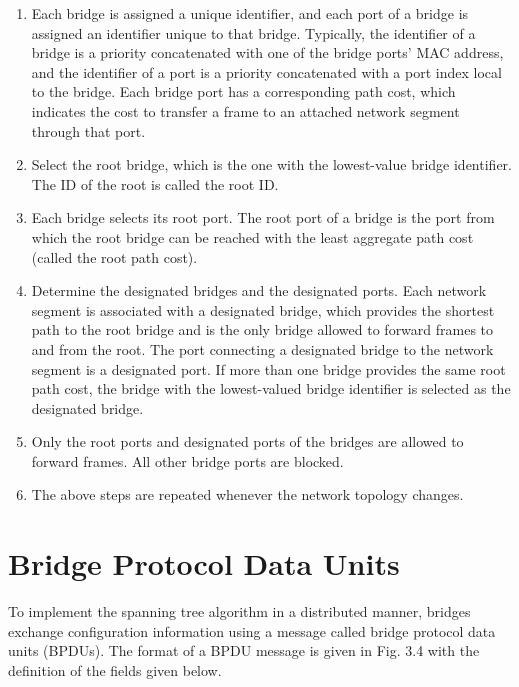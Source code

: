 \documentclass{../UTNetLab}
\begin{document}
\begin{enumerate}
    \item Each bridge is assigned a unique identifier, and each port of a bridge is
    assigned an identifier unique to that bridge. Typically, the identifier of
    a bridge is a priority concatenated with one of the bridge ports’ MAC
    address, and the identifier of a port is a priority concatenated with a port
    index local to the bridge. Each bridge port has a corresponding path
    cost, which indicates the cost to transfer a frame to an attached network
    segment through that port.

    \item Select the root bridge, which is the one with the lowest-value bridge
    identifier. The ID of the root is called the root ID.

    \item Each bridge selects its root port. The root port of a bridge is the port
    from which the root bridge can be reached with the least aggregate path
    cost (called the root path cost).

    \item Determine the designated bridges and the designated ports. Each network
    segment is associated with a designated bridge, which provides the
    shortest path to the root bridge and is the only bridge allowed to forward
    frames to and from the root. The port connecting a designated bridge to
    the network segment is a designated port. If more than one bridge provides
    the same root path cost, the bridge with the lowest-valued bridge
    identifier is selected as the designated bridge.

    \item Only the root ports and designated ports of the bridges are allowed to
    forward frames. All other bridge ports are blocked.
    
    \item The above steps are repeated whenever the network topology changes.
\end{enumerate}

\section{Bridge Protocol Data Units}
\label{appendix:bpdu}
    To implement the spanning tree algorithm in a distributed manner, bridges exchange configuration information using a message called bridge
    protocol data units (BPDUs).
    The format of a BPDU message is given in Fig. 3.4 with the definition of the fields given below.
\end{document}
